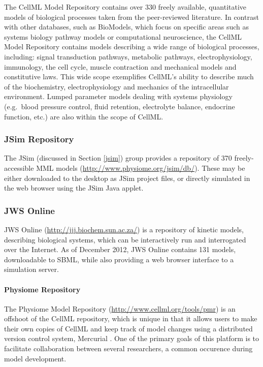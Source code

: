 The CellML Model Repository contains over 330 freely available,
quantitative models of biological processes taken from the peer-reviewed
literature. In contrast with other databases, such as BioModels, which
focus on specific areas such as systems biology pathway models or
computational neuroscience, the CellML Model Repository contains models
describing a wide range of biological processes, including: signal
transduction pathways, metabolic pathways, electrophysiology,
immunology, the cell cycle, muscle contraction and mechanical models and
constitutive laws. This wide scope exemplifies CellML's ability to
describe much of the biochemistry, electrophysiology and mechanics of
the intracellular environment. Lumped parameter models dealing with
systems physiology (e.g.~blood pressure control, fluid retention,
electrolyte balance, endocrine function, etc.) are also within the scope
of CellML.

\subsubsection{JSim Repository}

The JSim (discussed in Section \ref{jsim}) group provides a repository
of 370 freely-accessible MML models
(\url{http://www.physiome.org/jsim/db/}). These may be either downloaded
to the desktop as JSim project files, or directly simulated in the web
browser using the JSim Java applet.

\subsubsection{JWS Online}

JWS Online (\url{http://jjj.biochem.sun.ac.za/})
\autocite{olivier2004web} is a repository of kinetic models, describing
biological systems, which can be interactively run and interrogated over
the Internet. As of December 2012, JWS Online contains 131 models,
downloadable to SBML, while also providing a web browser interface to a
simulation server.

\paragraph{Physiome Repository}

The Physiome Model Repository (\url{http://www.cellml.org/tools/pmr})
\autocite{yu2011physiome} is an offshoot of the CellML repository, which
is unique in that it allows users to make their own copies of CellML and
keep track of model changes using a distributed version control system,
Mercurial \autocite{o2007distributed}. One of the primary goals of this
platform is to facilitate collaboration between several researchers, a
common occurence during model development.

